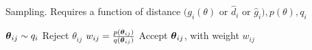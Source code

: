 \begin{algorithm}[H]
    \centering
    \caption{Sampling. Requires a function of distance $(g_i(\theta)$ or $\hat{d}_i$ or $\hat{g}_i), p(\theta), q_i$}\label{alg:sampling_GB}
    \begin{algorithmic}[1]
          \State $\boldsymbol{\theta}_{ij} \sim q_i$
            \State Reject $\theta_{ij}$
          \Else {}
            \State $w_{ij} = \frac{p(\boldsymbol{\theta}_{ij})}{q(\boldsymbol{\theta}_{ij})}$
            \State Accept $\boldsymbol{\theta}_{ij}$, with weight $w_{ij}$
          \EndIf
      \EndFor
      \EndFor
    \end{algorithmic}
\end{algorithm}
